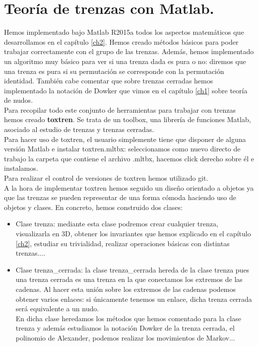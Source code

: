 \newpage
\section{Teoría de trenzas con Matlab.}
Hemos implementado bajo Matlab R2015a todos los aspectos matemáticos que desarrollamos en el capítulo \ref{ch2}. Hemos creado métodos básicos para poder trabajar correctamente con el grupo de las trenzas. Además, hemos implementado un algoritmo muy básico para ver si una trenza dada es pura o no: diremos que una trenza es pura si su permutación se corresponde con la permutación identidad. También cabe comentar que sobre trenzas cerradas hemos implementado la notación de Dowker que vimos en el capítulo \ref{ch1} sobre teoría de nudos. \\

Para recopilar todo este conjunto de herramientas para trabajar con trenzas hemos creado \textbf{toxtren}. Se trata de un toolbox, una librería de funciones Matlab, asociado al estudio de trenzas y trenzas cerradas.  \\ 

Para hacer uso de toxtren, el usuario simplemente tiene que disponer de alguna versión Matlab e instalar toxtren.mltbx: seleccionamos como nuevo directo de trabajo la carpeta que contiene el archivo .mltbx, hacemos click derecho sobre él e instalamos. \\

Para realizar el control de versiones de toxtren hemos utilizado git.\\

A la hora de implementar toxtren hemos seguido un diseño orientado a objetos ya que las trenzas se pueden representar de una forma cómoda haciendo uso de objetos y clases. En concreto, hemos construido dos clases: 
\begin{itemize}
	\item Clase trenza: mediante esta clase podremos crear cualquier trenza, visualizarla en 3D, obtener los invariantes que hemos explicado en el capítulo \ref{ch2}, estudiar su trivialidad, realizar operaciones básicas con distintas trenzas....
	\item Clase trenza\_cerrada: la clase trenza\_cerrada hereda de la clase trenza pues una trenza cerrada es una trenza en la que conectamos los extremos de las cadenas. Al hacer esta unión sobre los extremos de las cadenas podemos obtener varios enlaces: si únicamente tenemos un enlace, dicha trenza cerrada será equivalente a un nudo. \\
	En dicha clase heredamos los métodos que hemos comentado para la clase trenza y además estudiamos la notación Dowker de la trenza cerrada, el polinomio de Alexander, podemos realizar los movimientos de Markov...
\end{itemize} 

